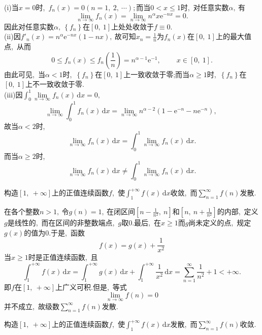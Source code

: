 	\begin{solution}
		(i)当$x=0$时,\ $f_n(x)=0(n=1,\ 2,\ \cdots);$而当$0<x\le 1$时,\ 对任意实数$\alpha,\ $有
		$$\lim\limits_{n\rightarrow\infty}f_n(x)=\lim\limits_{n\rightarrow\infty}n^\alpha x\text{e}^{-nx}=0.$$
		因此对任意实数$\alpha,\ \left\{f_n\right\}$在$\left[0,\ 1\right]$上处处收敛于$f\equiv0.$\\
		(ii)因$f'_n(x)=n^\alpha \text{e}^{-nx}(1-nx),\ $故可知$x_n=\frac{1}{n}$为$f_n(x)$在$\left[0,\ 1\right]$上的最大值点,\ 从而
		$$0\le f_n(x)\le f_n\left(\frac{1}{n}\right)=n^{\alpha-1}\text{e}^{-1},\ \qquad x\in\left[0,\ 1\right].$$
		由此可见,\ 当$\alpha<1$时,\ $\left\{f_n\right\}$在$\left[0,\ 1\right]$上一致收敛于零;而当$\alpha\ge 1$时,\ $\left\{f_n\right\}$在$\left[0,\ 1\right]$上不一致收敛于零.\\
		(iii)因$\int_{0}^{1}\lim\limits_{n\rightarrow\infty}f_n(x)\,\text{d}x=0,\ $
		$$\lim\limits_{n\rightarrow\infty}\int_{0}^{1}f_n(x)\,\text{d}x=\lim\limits_{n\rightarrow\infty}n^{\alpha-2}(1-\text{e}^{-n}-n\text{e}^{-n}),\ $$
		故当$\alpha<2$时,\ 
		$$\lim\limits_{n\rightarrow\infty}f_n(x)\,\text{d}x=\int_{0}^{1}\lim\limits_{n\rightarrow\infty}f_n(x)\,\text{d}x.$$
		而当$\alpha\ge2$时,\ 
		$$\lim\limits_{n\rightarrow\infty}f_n(x)\,\text{d}x\neq\int_{0}^{1}\lim\limits_{n\rightarrow\infty}f_n(x)\,\text{d}x.$$ 
	\end{solution}
	\newpage
	\begin{problem}
		构造$\left[1,\ +\infty\right]$上的正值连续函数$f$,\ 使$\int_{1}^{+\infty}f(x)\,\text{d}x$收敛,\ 而$\sum\limits_{n=1}^{\infty}f(n)$发散.
	\end{problem}
	
	\begin{solution}
		在各个整数$n>1,\ $令$g(n)=1,\ $在闭区间$\left[n-\frac{1}{n^2},\ n\right]$和$\left[n,\ n+\frac{1}{n^2}\right]$的内部,\ 定义$g$是线性的,\ 而在区间的非整数端点,\ $g$取$0.$最后,\ 在$x\ge1$而$g$尚未定义的点,\ 规定$g(x)$的值为$0.$于是,\ 函数
		$$f(x)=g(x)+\frac{1}{x^2}$$
		当$x\ge1$时是正值连续函数,\ 且
		$$\int_{1}^{+\infty}f(x)\,\text{d}x=\int_{1}^{+\infty}g(x)\,\text{d}x+\int_{1}^{+\infty}\frac{1}{x^2}\,\text{d}x=\sum\limits_{n=1}^{\infty}\frac{1}{n^2}+1<+\infty.$$
		即$f$在$\left[1,\ +\infty\right]$上广义可积.但是,\ 等式
		$$\lim\limits_{n\rightarrow\infty}f(n)=0$$
		并不成立,\ 故级数$\sum\limits_{n=1}^{\infty}f(n)$发散. 
	\end{solution}
	\newpage
	\begin{problem}
		构造$\left[1,\ +\infty\right]$上的正值连续函数$f$,\ 使$\int_{1}^{+\infty}f(x)\,\text{d}x$发散,\ 而$\sum\limits_{n=1}^{\infty}f(n)$收敛.
	\end{problem}
	
